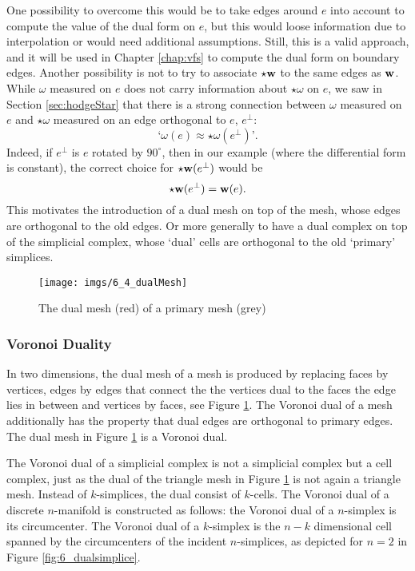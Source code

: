 One possibility to overcome this would be to take edges around $e$ into account to compute the value of the dual form on $e$, but this would loose information due to interpolation or would need additional assumptions. Still, this is a valid approach, and it will be used in Chapter \ref{chap:vfs} to compute the dual form on boundary edges. Another possibility is not to try to associate $\star \textbf{w}$ to the same edges as $\textbf{w}$. While $\omega$ measured on $e$ does not carry information about $\star \omega$ on $e$, we saw in Section \ref{sec:hodgeStar} that there is a strong connection between $\omega$ measured on $e$ and $\star \omega$ measured on an edge orthogonal to $e$, $e^\perp$:
\[\text{`}\omega(e) \approx \star \omega (e^\perp)\text{'}.\]
Indeed, if $e^\perp$ is $e$ rotated by $90^\circ$, then in our example (where the differential form is constant), the correct choice for $\star \textbf{w}(e^\perp)$ would be
\[\star \textbf{w}(e^\perp) = \textbf{w}(e).\]
This motivates the introduction of a dual mesh on top of the mesh, whose edges are orthogonal to the old edges. Or more generally to have a dual complex on top of the simplicial complex, whose `dual' cells are orthogonal to the old `primary' simplices.

\begin{figure}%
\begin{center}
\texttt{[image: imgs/6\_4\_dualMesh]}
\end{center}
\caption{The dual mesh (red) of a primary mesh (grey)}%
\label{fig:6_dualmesh}%
\end{figure}

\subsubsection{Voronoi Duality}
In two dimensions, the dual mesh of a mesh is produced by replacing faces by vertices, edges by edges that connect the the vertices dual to the faces the edge lies in between and vertices by faces, see Figure \ref{fig:6_dualmesh}. The Voronoi dual of a mesh additionally has the property that dual edges are orthogonal to primary edges. The dual mesh in Figure \ref{fig:6_dualmesh} is a Voronoi dual.

The Voronoi dual of a simplicial complex is not a simplicial complex but a cell complex, just as the dual of the triangle mesh in Figure \ref{fig:6_dualmesh} is not again a triangle mesh. Instead of $k$-simplices, the dual consist of $k$-cells.
The Voronoi dual of a discrete $n$-manifold is constructed as follows: the Voronoi dual of a $n$-simplex is its circumcenter. The Voronoi dual of a $k$-simplex is the $n-k$ dimensional cell spanned by the circumcenters of the incident $n$-simplices, as depicted for $n=2$ in Figure \ref{fig:6_dualsimplice}. 


